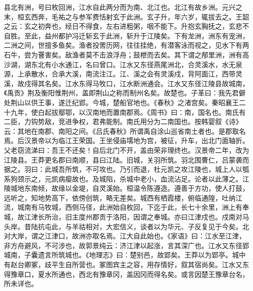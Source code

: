 \documentclass[12pt,UTF8]{ctexbook}
\begin{document}
县北有洲，号曰枚回洲，江水自此两分而为南、北江也。北江有故乡洲。元兴之末，桓玄西奔，毛祐之与参军费恬射玄于此洲。玄子升，年六岁，辄拔去之。王韶之云：玄之初奔也，经日不得食，左右进粗粥，咽不能下。升抱玄胸抚之，玄悲不自胜。至此，益州都护冯迁斩玄于此洲，斩升于江陵矣。下有龙洲，洲东有宠洲，二洲之间，世擅多鱼矣。渔者投罟历网，往往挂绝，有潜客泳而视之，见水下有两石牛，尝为罾害矣。敌渔者莫不击浪浮舟；鼓枻而去矣。其下谓之邴里洲，洲有高沙湖，湖东北有小水通江，名曰曾口。江水又东径燕尾洲北，合灵溪水，水无泉源，上承散水，合承大溪，南流注江。江、溪之会有灵溪戍，背阿面江，西带灵溪，故戍得其名矣。江水东得马牧口，江水断洲通会。江水又东径江陵县故城南，《禹贡》荆及衡阳惟荆州，盖即荆山之称而制州名矣。故楚也。子革曰：我先君僻处荆山以供王事，遂迁纪郢。今城，楚船官地也。《春秋》之渚宫矣。秦昭襄王二十九年，使白起拔鄢鄂，以汉南地而置南郡焉。《周书》曰：南，国名也。南氏有二臣，力钩势敌，竞进争权，君弗能制。南氏用分为二南国也。按韩婴叙《诗》云：其地在南郡、南阳之间。《吕氏春秋》所谓禹自涂山巡省南土者也。是郡取名焉。后汉景帝以为临江王荣国。王坐侵庙壖地为宫，被征，升车，出北门面轴折。父老窃流涕曰：吾王不还矣！自后北门不开，盖由荣非理终也。汉景帝二年，改为江陵县。王莽更名郡曰南顺，县曰江陆。旧城，关羽所筑。羽北围曹仁，吕蒙袭而据之。羽曰：此城吾所筑，不可攻也。乃引而退，杜元凯之攻江陵也，城上人以瓠系狗颈示之，元凯病瘿故也。及城陷，杀城中老小，血流沾足。论者以此薄之。江陵城地东南倾，故缘以金堤，自灵溪始。桓温令陈遵造。遵善于方功，使人打鼓，远听之，知地势高下，依傍创筑，略无差矣。城西有栖霞楼，俯临通隍，吐纳江流，城南有马牧城，西侧马径，此洲始自枚回，下迄于此，长七十余里，洲上有奉城，故江津长所治，旧主度州郡贡于洛阳，因谓之奉城。亦曰江津戍也。戍南对马头岸。昔陆抗屯此，与羊祜相对，大宏信义，谈者以为华元、子反复见于今矣。北对大岸，谓之江津口，故洲亦取名焉。江大自此始也。《家语》曰：江水至江津，非方舟避风，不可涉也，故郭景纯云：济江津以起涨，言其深广也。江水又东径郢城南，子囊遗言所筑城也。《地理志》曰：楚别邑，故郢矣。王莽以为郢亭。城中有赵台卿冢，歧平生自所营也。冢图宾主之容，用存情好，叙其宿尚矣。江水又东得豫章口，夏水所通也，西北有豫章冈，盖因冈而得名矣。或言因楚王豫章台名，所未详也。
\end{document}
